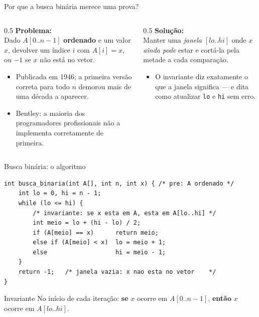 \documentclass[aspectratio=169]{beamer}
\begin{document}
\begin{frame}{Por que a busca binária merece uma prova?}
  \begin{columns}[T]
    \begin{column}{0.5\textwidth}
      \textbf{Problema:}\\[2pt]
      Dado $A[0..n-1]$ \textbf{ordenado} e um valor $x$, devolver um índice $i$ com
      $A[i] = x$, ou $-1$ se $x$ não está no vetor.
      \begin{itemize}
        \item Publicada em 1946; a primeira versão correta para todo $n$ demorou
          mais de uma década a aparecer.
        \item Bentley: a maioria dos programadores profissionais não a implementa
          corretamente de primeira.
      \end{itemize}
    \end{column}
    \begin{column}{0.5\textwidth}
      \textbf{Solução:}\\[2pt]
      Manter uma \emph{janela} $[lo..hi]$ onde $x$ \emph{ainda pode} estar e cortá-la
      pela metade a cada comparação.
      \begin{itemize}
        \item O invariante diz exatamente o que a janela significa --- e dita como
          atualizar \texttt{lo} e \texttt{hi} sem erro.
      \end{itemize}
    \end{column}
  \end{columns}
\end{frame}

\begin{frame}[fragile]{Busca binária: o algoritmo}
\begin{lstlisting}
int busca_binaria(int A[], int n, int x) { /* pre: A ordenado */
    int lo = 0, hi = n - 1;
    while (lo <= hi) {
        /* invariante: se x esta em A, esta em A[lo..hi] */
        int meio = lo + (hi - lo) / 2;
        if (A[meio] == x)      return meio;
        else if (A[meio] < x)  lo = meio + 1;
        else                   hi = meio - 1;
    }
    return -1;   /* janela vazia: x nao esta no vetor    */
}
\end{lstlisting}
  \begin{block}{Invariante}
    No início de cada iteração: \textbf{se} $x$ ocorre em $A[0..n-1]$,
    \textbf{então} $x$ ocorre em $A[lo..hi]$.
  \end{block}
\end{frame}
\end{document}
